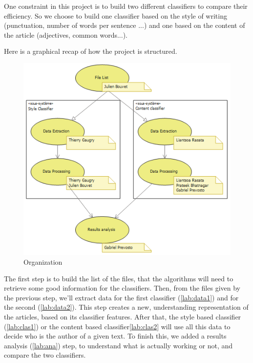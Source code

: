 One constraint in this project is to build two different classifiers to compare their efficiency. So we choose to build one classifier based on the style of writing (punctuation, number of words per sentence ...) and one based on the content of the article (adjectives, common words...).

Here is a graphical recap of how the project is structured.
\begin{figure}[h]
	\centering
		\includegraphics{Images/organization.png}
	\caption{Organization}
	\label{fig:organization}
\end{figure}

The first step is to build the list of the files, that the algorithms will need to retrieve some good information for the classifiers.
Then, from the files given by the previous step, we'll extract data for the first classifier (\ref{lab:data1}) and for the second (\ref{lab:data2}). This step creates a new, understanding representation of the articles, based on its classifier features.
After that, the style based classifier (\ref{lab:clas1}) or the content based classifier\ref{lab:clas2} will use all this data to decide who is the author of a given text.
To finish this, we added a results analysis (\ref{lab:ana}) step, to understand what is actually working or not, and compare the two classifiers.
